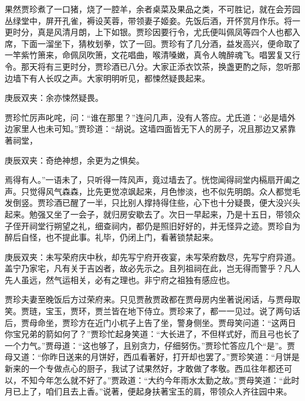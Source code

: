 \begin{parag}
    果然贾珍煮了一口猪，烧了一腔羊，余者桌菜及果品之类，不可胜记，就在会芳园丛绿堂中，屏开孔雀，褥设芙蓉，带领妻子姬妾。先饭后酒，开怀赏月作乐。将一更时分，真是风清月朗，上下如银。贾珍因要行令，尤氏便叫佩凤等四个人也都入席，下面一溜坐下，猜枚划拳，饮了一回。贾珍有了几分酒，益发高兴，便命取了一竿紫竹箫来，命佩凤吹箫，文花唱曲，喉清嗓嫩，真令人魄醉魂飞。唱罢复又行令。那天将有三更时分，贾珍酒已八分。大家正添衣饮茶，换盏更酌之际，忽听那边墙下有人长叹之声。大家明明听见，都悚然疑畏起来。\begin{note}庚辰双夹：余亦悚然疑畏。\end{note}贾珍忙厉声叱咤，问：“谁在那里？”连问几声，没有人答应。尤氏道：“必是墙外边家里人也未可知。”贾珍道：“胡说。这墙四面皆无下人的房子，况且那边又紧靠著祠堂，\begin{note}庚辰双夹：奇绝神想，余更为之惧矣。\end{note}焉得有人。”一语未了，只听得一阵风声，竟过墙去了。恍惚闻得祠堂内槅扇开阖之声。只觉得风气森森，比先更觉凉飒起来，月色惨淡，也不似先明朗。众人都觉毛发倒竖。贾珍酒已醒了一半，只比别人撑持得住些，心下也十分疑畏，便大没兴头起来。勉强又坐了一会子，就归房安歇去了。次日一早起来，乃是十五日，带领众子侄开祠堂行朔望之礼，细查祠内，都仍是照旧好好的，并无怪异之迹。贾珍自为醉后自怪，也不提此事。礼毕，仍闭上门，看著锁禁起来。\begin{note}庚辰双夹：未写荣府庆中秋，却先写宁府开夜宴，未写荣府数尽，先写宁府异道。盖宁乃家宅，凡有关于吉凶者，故必先示之。且列祖祠在此，岂无得而警乎？凡人先人虽远，然气运相关，必有之理也。非宁府之祖独有感应也。\end{note}
\end{parag}


\begin{parag}
    贾珍夫妻至晚饭后方过荣府来。只见贾赦贾政都在贾母房内坐著说闲话，与贾母取笑。贾琏，宝玉，贾环，贾兰皆在地下侍立。贾珍来了，都一一见过。说了两句话后，贾母命坐，贾珍方在近门小杌子上告了坐，警身侧坐。贾母笑问道：“这两日你宝兄弟的箭如何了？”贾珍忙起身笑道：“大长进了，不但样式好，而且弓也长了一个力气。”贾母道：“这也够了，且别贪力，仔细努伤。”贾珍忙答应几个“是”。贾母又道：“你昨日送来的月饼好，西瓜看著好，打开却也罢了。”贾珍笑道：“月饼是新来的一个专做点心的厨子，我试了试果然好，才敢做了孝敬。西瓜往年都还可以，不知今年怎么就不好了。”贾政道：“大约今年雨水太勤之故。”贾母笑道：“此时月已上了，咱们且去上香。”说著，便起身扶著宝玉的肩，带领众人齐往园中来。
\end{parag}


